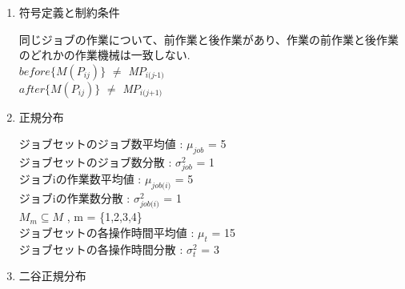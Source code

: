 \documentclass[twocolumn]{jarticle}
\begin{document}
    \begin{enumerate}
    \item \label{item:setting} 符号定義と制約条件
    
    
    同じジョブの作業について、前作業と後作業があり、作業の前作業と後作業のどれかの作業機械は一致しない.\\

    $before\{\textit{M}(P_{\textit{ij}})\}$ $\neq$ \textit{M}$P_{\textit{i(j-1)}}$ \\
    $after\{\textit{M}(P_{\textit{ij}})\}$ $\neq$ \textit{M}$P_{\textit{i(j+1)}}$ \\

    \item 正規分布
    
    ジョブセットのジョブ数平均値 : $\mu_{\textit{job}}$ = 5\\
    ジョブセットのジョブ数分散 : $\sigma^2_{\textit{job}}$ = 1\\
    ジョブiの作業数平均値 : $\mu_\textit{job(i)}$ = 5\\
    ジョブiの作業数分散 : $\sigma^2_\textit{job(i)}$ = 1\\
    $\textit{M}_{\textit{m}} \subseteq \textit{M}$ , m = \{1,2,3,4\}\\
    ジョブセットの各操作時間平均値 : $\mu_{\textit{t}}$ = 15\\
    ジョブセットの各操作時間分散 : $\sigma^2_{\textit{t}}$ = 3\\

    \item 二谷正規分布
    

\end{enumerate}
\end{document}

